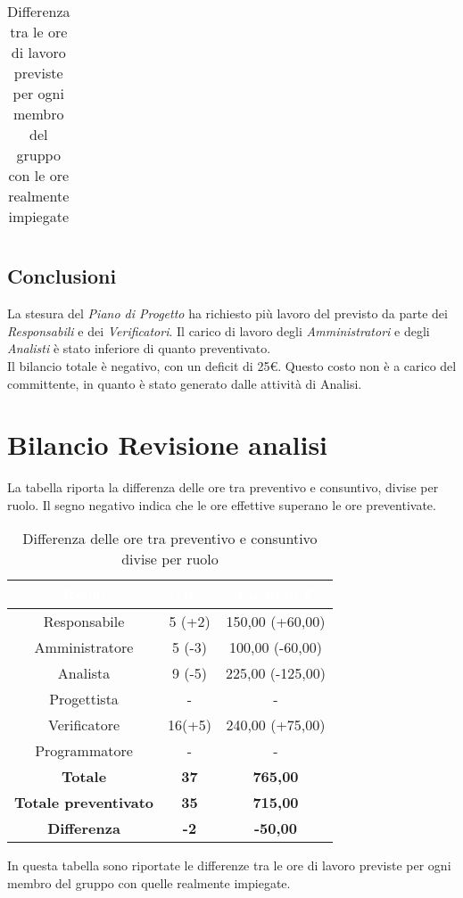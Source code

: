 \begin{flushleft}
\begin{table}[H]
\begin{center}
\begin{tabularx}{\textwidth}{|c|cccccc|c|}
 		\end{tabularx}
 		\caption{Differenza tra le ore di lavoro previste per ogni membro del gruppo con le ore realmente impiegate }
 		\end{center}
	 \end{table}
    \subsection{Conclusioni}
    La stesura del \textit{Piano di Progetto} ha richiesto più lavoro del previsto da parte dei \textit{Responsabili} e dei \textit{Verificatori}. Il carico di lavoro degli \textit{Amministratori} e degli \textit{Analisti} è stato inferiore di quanto preventivato.\\ Il bilancio totale è negativo, con un deficit di 25\euro. Questo costo non è a carico del committente, in quanto è stato generato dalle attività di Analisi.
    
    \newpage
    
\section{Bilancio Revisione analisi}\label{BilRevAn}
La tabella riporta la differenza delle ore tra preventivo e consuntivo, divise per ruolo. Il segno negativo indica che le ore effettive superano le ore preventivate.  
  
\begin{table}[H]
	\begin{center}
		\begin{tabular}{ccc}
			\rowcolor{coolblack}
			\hline
			\textcolor{white}{Ruolo} & \textcolor{white}{Ore} & \textcolor{white}{Costo in \euro}\\
			\hline
			Responsabile   & 5 (+2)  &  150,00 (+60,00) 	\\ 
			Amministratore & 5 (-3)  &  100,00 (-60,00) 	\\ 
			Analista       & 9 (-5)  &  225,00 (-125,00)   	\\ 
			Progettista    & -  	 &  - 					\\ 
			Verificatore   & 16(+5)  &  240,00 (+75,00) 	\\ 
			Programmatore  & -       &  -    		 		\\ \hline
			\textbf{Totale}& \textbf{37} & \textbf{765,00}	\\ \hline 
			\textbf{Totale preventivato}& \textbf{35} & \textbf{715,00}\\ \hline 
			\textbf{Differenza}& \textbf{-2} & \textbf{-50,00 }	\\ \hline  
		\end{tabular}
		\caption{Differenza delle ore tra preventivo e consuntivo divise per ruolo} 
	\end{center}
\end{table}
  \clearpage
In questa tabella  sono riportate le differenze tra le ore di lavoro previste per ogni membro del gruppo con quelle realmente impiegate.\\


\end{flushleft}
